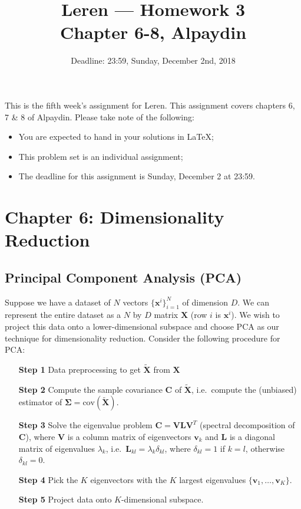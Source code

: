 \documentclass[11pt,a4paper]{article}
\title{Leren --- Homework 3\\[3mm]\small{Chapter 6-8, Alpaydin}}
\date{Deadline: 23:59, Sunday, December 2nd, 2018}
\begin{document}
\maketitle

This is the fifth week's assignment for Leren.  This assignment covers
chapters 6, 7 \& 8 of Alpaydin. Please take note of the following:

\begin{itemize}
  \item You are expected to hand in your solutions in \LaTeX;
  \item This problem set is an individual assignment;
  \item The deadline for this assignment is Sunday, December 2 at 23:59.
\end{itemize}

\newcommand{\xvec}{\boldsymbol{x}}
\newcommand{\xmat}{\boldsymbol{X}}
\newcommand{\cxmat}{\tilde{\xmat}}
\newcommand{\cxn}{\tilde{\xvec}^{i}}
\newcommand{\xvecn}{\xvec^{i}}
\newcommand{\xvecmean}{\boldsymbol{\mu}}
\newcommand{\zn}{\boldsymbol{z}^i}
\newcommand{\vvec}{\boldsymbol{v}}

\section{Chapter 6: Dimensionality Reduction}
\subsection{Principal Component Analysis (PCA)}
Suppose we have a dataset of $N$ vectors $\{\boldsymbol{x}^i\}_{i=1}^N$ of dimension $D$. We can represent the entire dataset as a $N$ by $D$ matrix $\boldsymbol{X}$ (row $i$ is $\boldsymbol{x}^i$). We wish to project this data onto a lower-dimensional subspace and choose PCA as our technique for dimensionality reduction. Consider the following procedure for PCA:

\begin{itemize}
\item [\textbf{Step 1}] Data preprocessing to get $\cxmat$ from $\boldsymbol{X}$ 
\item [\textbf{Step 2}] Compute the sample covariance $\boldsymbol{C}$ of $\cxmat$, i.e.~compute the (unbiased) estimator of $\boldsymbol{\Sigma}=\mathrm{cov}(\cxmat)$.
\item [\textbf{Step 3}] Solve the eigenvalue problem $\boldsymbol{C} = \boldsymbol{V}\boldsymbol{L}\boldsymbol{V}^T$ (spectral decomposition of $\boldsymbol{C}$), where $\boldsymbol{V}$ is a column matrix of eigenvectors $\vvec_k$ and $\boldsymbol{L}$ is a diagonal matrix of eigenvalues $\lambda_k$, i.e.~$\boldsymbol{L}_{kl}=\lambda_k\delta_{kl}$, where $\delta_{kl}=1$ if $k=l$, otherwise $\delta_{kl}=0$.
\item [\textbf{Step 4}] Pick the $K$ eigenvectors with the $K$ largest eigenvalues $\{\vvec_1,\ldots,\vvec_K\}$.
\item [\textbf{Step 5}] Project data onto $K$-dimensional subspace.
\end{itemize}
\end{document}
